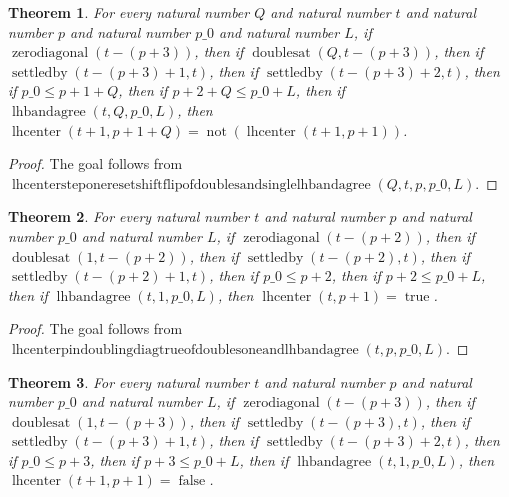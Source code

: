 \documentclass[11pt]{article}
\newtheorem{theorem}{Theorem}[section]
\theoremstyle{definition}
\begin{document}
\begin{theorem}
\label{ll:paper:lhcenter-step-one-reset-shift-flip-of-doubles-and-single-lhbandagree}
For every natural number \(Q\) and natural number \(t\) and natural number \(p\) and natural number \(p\_0\) and natural number \(L\), if \(\operatorname{zerodiagonal}(t - (p + 3))\), then if \(\operatorname{doublesat}(Q, t - (p + 3))\), then if \(\operatorname{settledby}(t - (p + 3) + 1, t)\), then if \(\operatorname{settledby}(t - (p + 3) + 2, t)\), then if \(p\_0 \le p + 1 + Q\), then if \(p + 2 + Q \le p\_0 + L\), then if \(\operatorname{lhbandagree}(t, Q, p\_0, L)\), then \(\operatorname{lhcenter}(t + 1, p + 1 + Q) = \operatorname{not}(\operatorname{lhcenter}(t + 1, p + 1))\).
\end{theorem}
\begin{proof}
The goal follows from \(\operatorname{lhcentersteponeresetshiftflipofdoublesandsinglelhbandagree}(Q, t, p, p\_0, L)\).
\end{proof}
\begin{theorem}
\label{ll:paper:lhcenter-pin-doubling-diag-true-of-doubles-one-and-lhbandagree}
For every natural number \(t\) and natural number \(p\) and natural number \(p\_0\) and natural number \(L\), if \(\operatorname{zerodiagonal}(t - (p + 2))\), then if \(\operatorname{doublesat}(1, t - (p + 2))\), then if \(\operatorname{settledby}(t - (p + 2), t)\), then if \(\operatorname{settledby}(t - (p + 2) + 1, t)\), then if \(p\_0 \le p + 2\), then if \(p + 2 \le p\_0 + L\), then if \(\operatorname{lhbandagree}(t, 1, p\_0, L)\), then \(\operatorname{lhcenter}(t, p + 1) = \operatorname{true}\).
\end{theorem}
\begin{proof}
The goal follows from \(\operatorname{lhcenterpindoublingdiagtrueofdoublesoneandlhbandagree}(t, p, p\_0, L)\).
\end{proof}
\begin{theorem}
\label{ll:paper:lhcenter-step-one-pin-reset-diag-false-of-doubles-one-and-lhbandagree}
For every natural number \(t\) and natural number \(p\) and natural number \(p\_0\) and natural number \(L\), if \(\operatorname{zerodiagonal}(t - (p + 3))\), then if \(\operatorname{doublesat}(1, t - (p + 3))\), then if \(\operatorname{settledby}(t - (p + 3), t)\), then if \(\operatorname{settledby}(t - (p + 3) + 1, t)\), then if \(\operatorname{settledby}(t - (p + 3) + 2, t)\), then if \(p\_0 \le p + 3\), then if \(p + 3 \le p\_0 + L\), then if \(\operatorname{lhbandagree}(t, 1, p\_0, L)\), then \(\operatorname{lhcenter}(t + 1, p + 1) = \operatorname{false}\).
\end{theorem}
\end{document}

